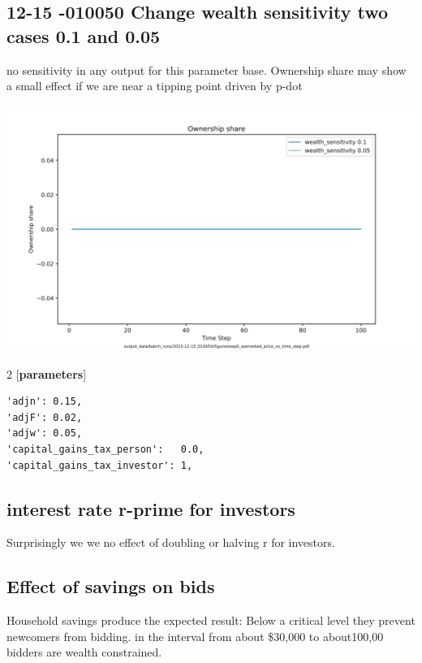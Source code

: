 



\subsection{12-15 -010050 Change wealth sensitivity two cases 0.1 and 0.05 }
no sensitivity in any output for this parameter base. Ownership share may show  a small effect if we are near a tipping point driven by p-dot

\includegraphics[scale=.45]{fig/Analysis/exp0_warranted_price_vs_time_step.png}


\begin{multicols}{2}
[\textbf{parameters}]
\begin{verbatim}
'adjn': 0.15,
'adjF': 0.02,
'adjw': 0.05, 
'capital_gains_tax_person':   0.0,
'capital_gains_tax_investor': 1,
\end{verbatim}

\end{multicols}


\subsection{interest rate r-prime for investors}
Surprisingly we we no effect of doubling or halving r for investors.


\subsection{Effect  of savings on bids}
Household savings produce the expected result: Below a critical level they prevent newcomers from bidding. in the interval from about \$30,000 to about100,00 bidders are wealth constrained. 

